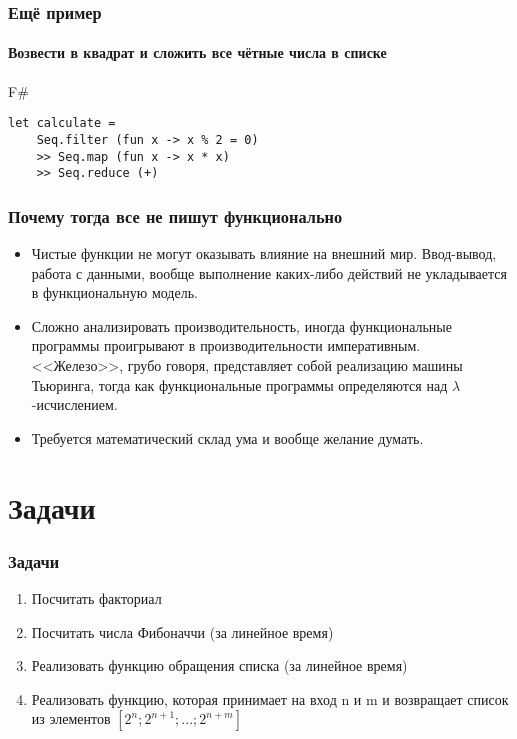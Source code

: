 \documentclass[xetex,mathserif,serif]{beamer}
\begin{document}
	\begin{frame}[fragile]
		\frametitle{Ещё пример}
		\framesubtitle{Возвести в квадрат и сложить все чётные числа в списке}
		\begin{exampleblock}{F\#}
			\begin{verbatim}
let calculate = 
    Seq.filter (fun x -> x % 2 = 0) 
    >> Seq.map (fun x -> x * x) 
    >> Seq.reduce (+)
            \end{verbatim}
		\end{exampleblock}
\end{frame}

	\begin{frame}
		\frametitle{Почему тогда все не пишут функционально}
		\begin{itemize}
			\item Чистые функции не могут оказывать влияние на внешний мир. Ввод-вывод, работа с данными,
					вообще выполнение каких-либо действий не укладывается в функциональную модель.
			\item Сложно анализировать производительность, иногда функциональные программы проигрывают
					в производительности императивным. <<Железо>>, грубо говоря, представляет собой 
					реализацию машины Тьюринга, тогда как функциональные программы определяются над
					$\lambda$-исчислением.
			\item Требуется математический склад ума и вообще желание думать.
		\end{itemize}
	\end{frame}

	\section{Задачи}

	\begin{frame}
		\frametitle{Задачи}
		\begin{enumerate}
			\item Посчитать факториал
			\item Посчитать числа Фибоначчи (за линейное время)
			\item Реализовать функцию обращения списка (за линейное время)
			\item Реализовать функцию, которая принимает на вход n и m и возвращает список из элементов $[2^n; 2^{n + 1}; ...; 2^{n + m}]$
		\end{enumerate}
	\end{frame}
\end{document}
